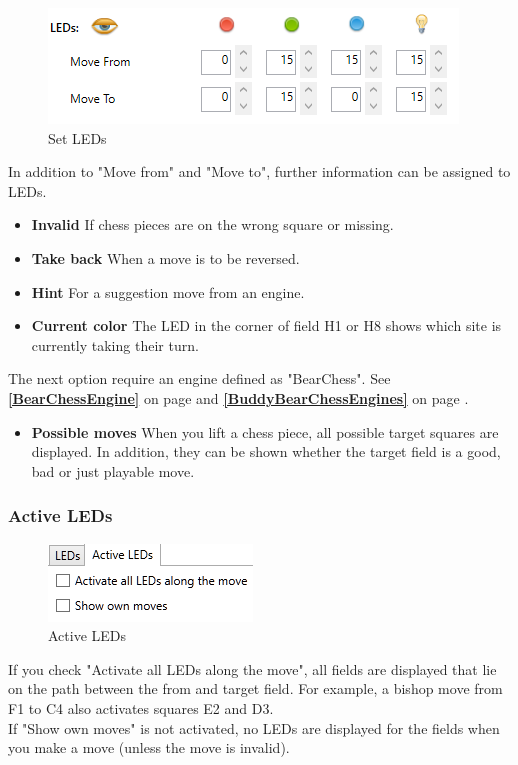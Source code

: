 \documentclass[11pt,a4paper]{article}
\begin{document}
\begin{figure}[H]
	\centering
	\includegraphics[scale=1.0]{ChessnutEvo3.png}
	\caption{Set LEDs }
	\label{fig:ChessnutEvo6}
\end{figure}
In addition to "Move from" and "Move to", further information can be assigned to LEDs.
\begin{itemize}
	\item \textbf{Invalid} If chess pieces are on the wrong square or missing.
	\item \textbf{Take back} When a move is to be reversed.
	\item \textbf{Hint} For a suggestion move from an engine.
	\item \textbf{Current color} The LED in the corner of field H1 or H8 shows which site is currently taking their turn.	       
\end{itemize}

The next option require an engine defined as "BearChess". See \textbf{\ref{BearChessEngine}  } on page \pageref{BearChessEngine} and \textbf{\ref{BuddyBearChessEngines}  } on page \pageref{BuddyBearChessEngines}.

\begin{itemize}
	\item \textbf{Possible moves} When you lift a chess piece, all possible target squares are displayed. In addition, they can be shown whether the target field is a good, bad or just playable move.
\end{itemize}


\subsubsection{Active LEDs}

\begin{figure}[H]
	\centering
	\includegraphics[scale=1.0]{iChessOne4.png}
	\caption{Active LEDs }
	\label{fig:ChessnutEvo7}
\end{figure}
If you check "Activate all LEDs along the move", all fields are displayed that lie on the path between the from and target field. For example, a bishop move from F1 to C4 also activates squares E2 and D3.\\
If "Show own moves" is not activated, no LEDs are displayed for the fields when you make a move (unless the move is invalid).
\end{document}
